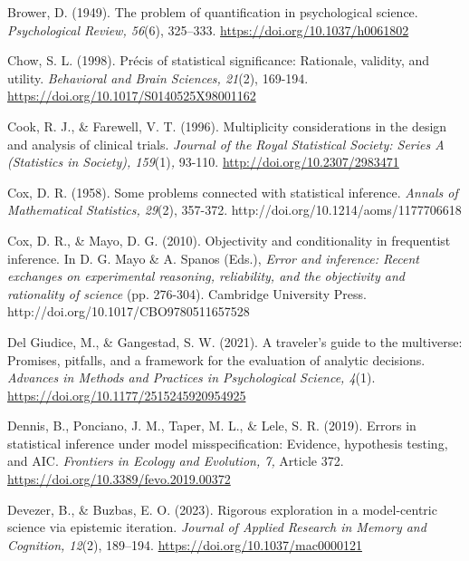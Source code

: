 \documentclass[authordate, empirical]{jote-new-article}
\begin{document}
	Brower, D. (1949). The problem of quantification in psychological science. \emph{Psychological Review, 56}(6), 325--333. \href{https://doi.org/10.1037/h0061802}{https://doi.org/10.1037/h0061802}



	Chow, S. L. (1998). Précis of statistical significance: Rationale, validity, and utility. \emph{Behavioral and Brain Sciences, 21}(2), 169-194. \href{https://doi.org/10.1017/S0140525X98001162}{https://doi.org/10.1017/S0140525X98001162}



	Cook, R. J., \& Farewell, V. T. (1996). Multiplicity considerations in the design and analysis of clinical trials.\emph{ Journal of the Royal Statistical Society: Series A (Statistics in Society), 159}(1)\emph{, }93-110. \href{http://doi.org/10.2307/2983471}{http://doi.org/10.2307/2983471}



	Cox, D. R. (1958). Some problems connected with statistical inference. \emph{Annals of Mathematical Statistics, 29}(2), 357-372. http://doi.org/10.1214/aoms/1177706618



	Cox, D. R., \& Mayo, D. G. (2010). Objectivity and conditionality in frequentist inference. In D. G. Mayo \& A. Spanos (Eds.), \emph{Error and inference: Recent exchanges on experimental reasoning, reliability, and the objectivity and rationality of science} (pp. 276-304). Cambridge University Press. http://doi.org/10.1017/CBO9780511657528



	Del Giudice, M., \& Gangestad, S. W. (2021). A traveler's guide to the multiverse: Promises, pitfalls, and a framework for the evaluation of analytic decisions. \emph{Advances in Methods and Practices in Psychological Science, 4}(1). \href{https://doi.org/10.1177/2515245920954925}{https://doi.org/10.1177/2515245920954925}



	Dennis, B., Ponciano, J. M., Taper, M. L., \& Lele, S. R. (2019). Errors in statistical inference under model misspecification: Evidence, hypothesis testing, and AIC. \emph{Frontiers in Ecology and Evolution, 7,} Article 372. \href{https://doi.org/10.3389/fevo.2019.00372}{https://doi.org/10.3389/fevo.2019.00372}



	Devezer, B., \& Buzbas, E. O. (2023). Rigorous exploration in a model-centric science via epistemic iteration. \emph{Journal of Applied Research in Memory and Cognition, 12}(2), 189--194. \href{https://doi.org/10.1037/mac0000121}{https://doi.org/10.1037/mac0000121}
\end{document}
